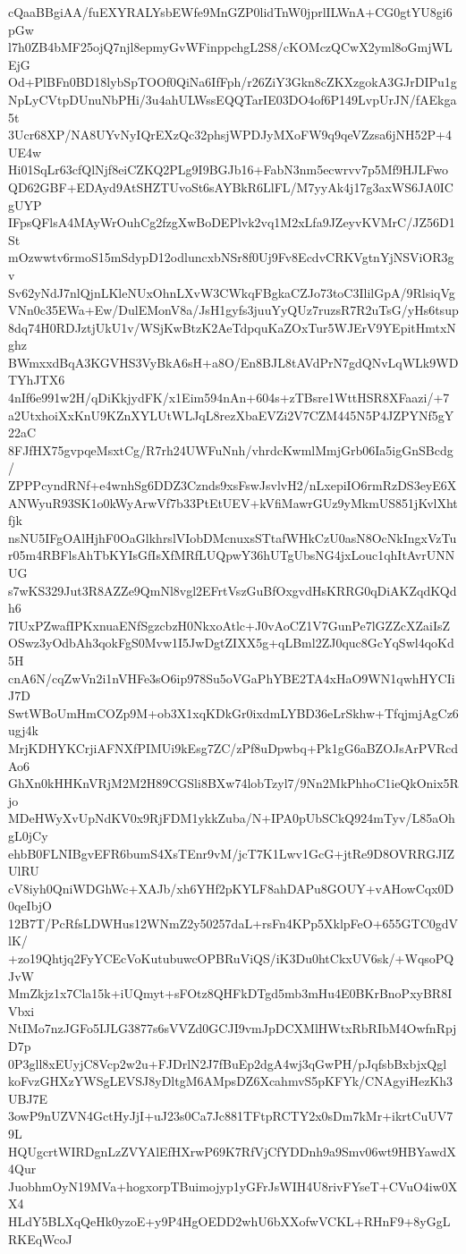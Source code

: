 cQaaBBgiAA/fuEXYRALYsbEWfe9MnGZP0lidTnW0jprlILWnA+CG0gtYU8gi6pGw
l7h0ZB4bMF25ojQ7njl8epmyGvWFinppchgL2S8/cKOMczQCwX2yml8oGmjWLEjG
Od+PlBFn0BD18lybSpTOOf0QiNa6IfFph/r26ZiY3Gkn8cZKXzgokA3GJrDIPu1g
NpLyCVtpDUnuNbPHi/3u4ahULWssEQQTarIE03DO4of6P149LvpUrJN/fAEkga5t
3Ucr68XP/NA8UYvNyIQrEXzQc32phsjWPDJyMXoFW9q9qeVZzsa6jNH52P+4UE4w
Hi01SqLr63cfQlNjf8eiCZKQ2PLg9I9BGJb16+FabN3nm5ecwrvv7p5Mf9HJLFwo
QD62GBF+EDAyd9AtSHZTUvoSt6sAYBkR6LlFL/M7yyAk4j17g3axWS6JA0ICgUYP
IFpsQFlsA4MAyWrOuhCg2fzgXwBoDEPlvk2vq1M2xLfa9JZeyvKVMrC/JZ56D1St
mOzwwtv6rmoS15mSdypD12odluncxbNSr8f0Uj9Fv8EcdvCRKVgtnYjNSViOR3gv
Sv62yNdJ7nlQjnLKleNUxOhnLXvW3CWkqFBgkaCZJo73toC3IlilGpA/9RlsiqVg
VNn0c35EWa+Ew/DulEMonV8a/JsH1gyfs3juuYyQUz7ruzsR7R2uTsG/yHs6tsup
8dq74H0RDJztjUkU1v/WSjKwBtzK2AeTdpquKaZOxTur5WJErV9YEpitHmtxNghz
BWmxxdBqA3KGVHS3VyBkA6sH+a8O/En8BJL8tAVdPrN7gdQNvLqWLk9WDTYhJTX6
4nIf6e991w2H/qDiKkjydFK/x1Eim594nAn+604s+zTBsre1WttHSR8XFaazi/+7
a2UtxhoiXxKnU9KZnXYLUtWLJqL8rezXbaEVZi2V7CZM445N5P4JZPYNf5gY22aC
8FJfHX75gvpqeMsxtCg/R7rh24UWFuNnh/vhrdcKwmlMmjGrb06Ia5igGnSBcdg/
ZPPPcyndRNf+e4wnhSg6DDZ3Cznds9xsFswJsvlvH2/nLxepiIO6rmRzDS3eyE6X
ANWyuR93SK1o0kWyArwVf7b33PtEtUEV+kVfiMawrGUz9yMkmUS851jKvlXhtfjk
nsNU5IFgOAlHjhF0OaGlkhrslVIobDMcnuxsSTtafWHkCzU0asN8OcNkIngxVzTu
r05m4RBFlsAhTbKYIsGfIsXfMRfLUQpwY36hUTgUbsNG4jxLouc1qhItAvrUNNUG
s7wKS329Jut3R8AZZe9QmNl8vgl2EFrtVszGuBfOxgvdHsKRRG0qDiAKZqdKQdh6
7IUxPZwafIPKxnuaENfSgzcbzH0NkxoAtlc+J0vAoCZ1V7GunPe7lGZZcXZaiIsZ
OSwz3yOdbAh3qokFgS0Mvw1I5JwDgtZIXX5g+qLBml2ZJ0quc8GcYqSwl4qoKd5H
cnA6N/cqZwVn2i1nVHFe3sO6ip978Su5oVGaPhYBE2TA4xHaO9WN1qwhHYCIiJ7D
SwtWBoUmHmCOZp9M+ob3X1xqKDkGr0ixdmLYBD36eLrSkhw+TfqjmjAgCz6ugj4k
MrjKDHYKCrjiAFNXfPIMUi9kEsg7ZC/zPf8uDpwbq+Pk1gG6aBZOJsArPVRcdAo6
GhXn0kHHKnVRjM2M2H89CGSli8BXw74lobTzyl7/9Nn2MkPhhoC1ieQkOnix5Rjo
MDeHWyXvUpNdKV0x9RjFDM1ykkZuba/N+IPA0pUbSCkQ924mTyv/L85aOhgL0jCy
ehbB0FLNIBgvEFR6bumS4XsTEnr9vM/jcT7K1Lwv1GcG+jtRe9D8OVRRGJIZUlRU
cV8iyh0QniWDGhWc+XAJb/xh6YHf2pKYLF8ahDAPu8GOUY+vAHowCqx0D0qeIbjO
12B7T/PcRfsLDWHus12WNmZ2y50257daL+rsFn4KPp5XklpFeO+655GTC0gdVlK/
+zo19Qhtjq2FyYCEcVoKutubuwcOPBRuViQS/iK3Du0htCkxUV6sk/+WqsoPQJvW
MmZkjz1x7Cla15k+iUQmyt+sFOtz8QHFkDTgd5mb3mHu4E0BKrBnoPxyBR8IVbxi
NtIMo7nzJGFo5IJLG3877s6sVVZd0GCJI9vmJpDCXMlHWtxRbRIbM4OwfnRpjD7p
0P3gll8xEUyjC8Vcp2w2u+FJDrlN2J7fBuEp2dgA4wj3qGwPH/pJqfsbBxbjxQgl
koFvzGHXzYWSgLEVSJ8yDltgM6AMpsDZ6XcahmvS5pKFYk/CNAgyiHezKh3UBJ7E
3owP9nUZVN4GctHyJjI+uJ23s0Ca7Jc881TFtpRCTY2x0sDm7kMr+ikrtCuUV79L
HQUgcrtWIRDgnLzZVYAlEfHXrwP69K7RfVjCfYDDnh9a9Smv06wt9HBYawdX4Qur
JuobhmOyN19MVa+hogxorpTBuimojyp1yGFrJsWIH4U8rivFYseT+CVuO4iw0XX4
HLdY5BLXqQeHk0yzoE+y9P4HgOEDD2whU6bXXofwVCKL+RHnF9+8yGgLRKEqWcoJ
